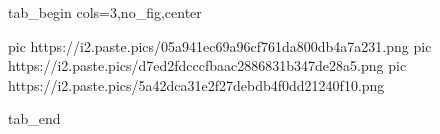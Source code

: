  
 
 
 
 


\ifcmt
  tab_begin cols=3,no_fig,center

     pic https://i2.paste.pics/05a941ec69a96cf761da800db4a7a231.png
		 pic https://i2.paste.pics/d7ed2fdcccfbaac2886831b347de28a5.png
		 pic https://i2.paste.pics/5a42dca31e2f27debdb4f0dd21240f10.png

  tab_end
\fi
